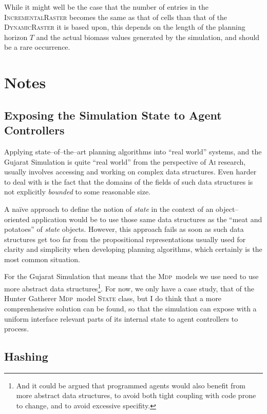 \documentclass[a4paper,10pt]{article}
\newcommand{\mdp}{\textsc{Mdp}}
\begin{document}
While it might well be the case that the number of entries in the \textsc{IncrementalRaster} becomes the same as that
of cells than that of the \textsc{DynamicRaster} it is based upon, this depends on the length of the planning horizon $T$
and the actual biomass values generated by the simulation, and should be a rare occurrence.

\section{Notes}

\subsection{Exposing the Simulation State to Agent Controllers}
\label{lw_states}

Applying state--of--the--art planning algorithms into ``real world'' systems, and the Gujarat Simulation
is quite ``real world'' from the perspective of \textsc{Ai} research, usually involves accessing and working on
complex data structures. Even harder to deal with is the fact that the domains of the fields of such data structures is 
not explicitly \emph{bounded} to some reasonable size. 

A naïve approach to define the notion of \emph{state} in the context of an object--oriented application would be to
use those same data structures as the ``meat and potatoes'' of \emph{state} objects. However, this approach fails as soon
as such data structures get too far from the propositional representations usually used for clarity and simplicity
when developing planning algorithms, which certainly is the most common situation.

For the Gujarat Simulation that means that the \mdp~models we use need to use more abstract data 
structures\footnote{And it could be argued that programmed agents would also benefit from more abstract data structures,
to avoid both tight coupling with code prone to change, and to avoid excessive specifity.}. For now, we only have a case
study, that of the Hunter Gatherer \mdp~model \textsc{State} class, but I do think that a more comprenhensive solution
can be found, so that the simulation can expose with a uniform interface relevant parts of its internal state to agent
controllers to process.

\subsection{Hashing}
\label{states_hashing}
\end{document}
